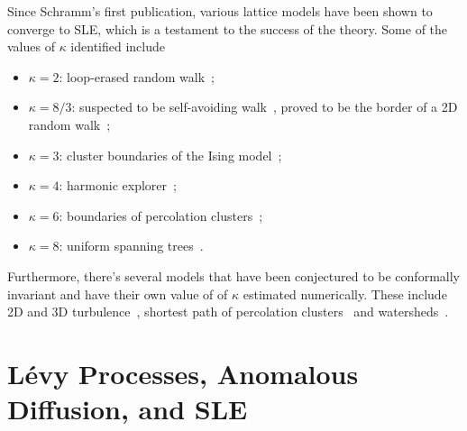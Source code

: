 Since Schramm's first publication, various lattice models have been shown to
converge to SLE, which is a testament to the success of the theory. Some of the
values of $\kappa$ identified include
\begin{itemize}
    \item $\kappa=2$: loop-erased random walk~\cite{Schramm2000};
    \item $\kappa=8/3$: suspected to be self-avoiding walk~\cite{Kennedy2002},
        proved to be the border of a 2D random walk~\cite{Lawler2001a};
    \item $\kappa=3$: cluster boundaries of the Ising model~\cite{Chelkak2014};
    \item $\kappa=4$: harmonic explorer~\cite{Schramm2005};
    \item $\kappa=6$: boundaries of percolation clusters~\cite{Smirnov2001b};
    \item $\kappa=8$: uniform spanning trees~\cite{Schramm2000}.
\end{itemize}
Furthermore, there's several models that have been conjectured to be
conformally invariant and have their own value of of $\kappa$ estimated
numerically. These include 2D and 3D turbulence~\cite{Bernard2006,
Thalabard2011}, shortest path of percolation clusters~\cite{Pose2014} and
watersheds~\cite{Daryaei2012}.


\section{Lévy Processes, Anomalous Diffusion, and SLE}
\label{sec:levy}

